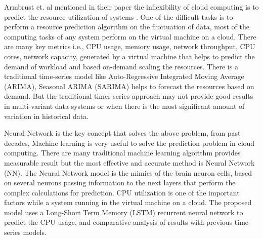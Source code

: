  Armbrust et. al mentioned in their paper the inflexibility of cloud computing is to predict the resource utilization of systems \cite{duggan2017predicting}. One of the difficult tasks is to perform a resource prediction algorithm on the fluctuation of data, most of the computing tasks of any system perform on the virtual machine on a cloud. There are many key metrics i.e., CPU usage, memory usage, network throughput, CPU cores, network capacity, generated by a virtual machine that helps to predict the demand of workload and based on-demand scaling the resources. There is a traditional time-series model like Auto-Regressive Integrated Moving Average (ARIMA), Seasonal ARIMA (SARIMA) helps to forecast the resources based on demand\cite{zharikov2020adaptive}. But the traditional timer-series approach may not provide good results in multi-variant data systems or when there is the most significant amount of variation in historical data.
 
Neural Network is the key concept that solves the above problem, from past decades, Machine learning is very useful to solve the prediction problem in cloud computing\cite{duggan2017predicting,kumar2018workload}. There are many traditional machine learning algorithm provides measurable result but the most effective and accurate method is Neural Network (NN). The Neural Network model is the mimics of the brain neuron cells, based on several neurons passing information to the next layers that perform the complex calculations for prediction. CPU utilization is one of the important factors while a system running in the virtual machine on a cloud. The proposed model uses a Long-Short Term Memory (LSTM) recurrent neural network to predict the CPU usage, and comparative analysis of results with previous time-series models.
